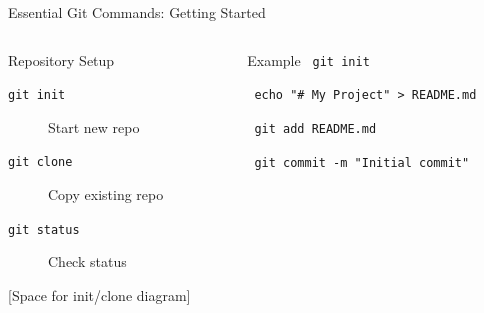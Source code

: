 \documentclass[aspectratio=169]{beamer}
\begin{document}
\begin{frame}{Essential Git Commands: Getting Started}
  \begin{columns}
    \begin{column}{0.48\textwidth}
      \begin{block}{Repository Setup}
        \begin{description}
          \item[\texttt{git init}] Start new repo
          \item[\texttt{git clone}] Copy existing repo
          \item[\texttt{git status}] Check status
        \end{description}
      \end{block}
      
      \begin{center}
        [Space for init/clone diagram]
      \end{center}
    \end{column}
    
    \begin{column}{0.48\textwidth}
      \begin{exampleblock}{Example}
        \small
        \texttt{\textdollar{} git init}
        
        \texttt{\textdollar{} echo "\# My Project" > README.md}
        
        \texttt{\textdollar{} git add README.md}
        
        \texttt{\textdollar{} git commit -m "Initial commit"}
      \end{exampleblock}
    \end{column}
  \end{columns}
\end{frame}
\end{document}
